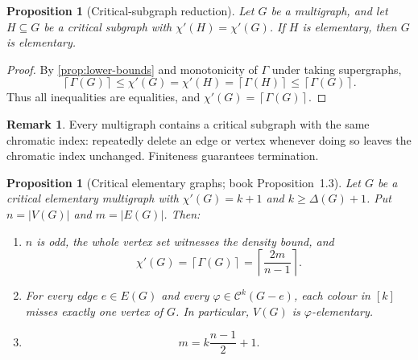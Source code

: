 \documentclass[11pt]{article}
\newtheorem{proposition}[theorem]{Proposition}
\theoremstyle{definition}
\newtheorem{remark}[theorem]{Remark}
\newcommand{\calC}{\mathcal C}
\newcommand{\abs}[1]{\lvert #1\rvert}
\newcommand{\ceil}[1]{\left\lceil #1\right\rceil}
\begin{document}
\begin{proposition}[Critical-subgraph reduction]\label{prop:critical-core}
Let $G$ be a multigraph, and let $H\subseteq G$ be a critical subgraph with
$\chi'(H)=\chi'(G)$.  If $H$ is elementary, then $G$ is elementary.
\end{proposition}

\begin{proof}
By \cref{prop:lower-bounds} and monotonicity of $\Gamma$ under taking
supergraphs,
\[
  \ceil{\Gamma(G)}
  \le \chi'(G)
  =\chi'(H)
  =\ceil{\Gamma(H)}
  \le\ceil{\Gamma(G)}.
\]
Thus all inequalities are equalities, and
$\chi'(G)=\ceil{\Gamma(G)}$.
\end{proof}

\begin{remark}
Every multigraph contains a critical subgraph with the same chromatic index:
repeatedly delete an edge or vertex whenever doing so leaves the chromatic index
unchanged.  Finiteness guarantees termination.
\end{remark}

\begin{proposition}[Critical elementary graphs; book Proposition~1.3]
\label{prop:critical-elementary}
Let $G$ be a critical elementary multigraph with
$\chi'(G)=k+1$ and $k\ge\Delta(G)+1$.  Put $n=\abs{V(G)}$ and
$m=\abs{E(G)}$.  Then:
\begin{enumerate}
  \item $n$ is odd, the whole vertex set witnesses the density bound, and
  \[
    \chi'(G)=\ceil{\Gamma(G)}
    =\ceil{\frac{2m}{n-1}}.
  \]
  \item For every edge $e\in E(G)$ and every
  $\varphi\in\calC^k(G-e)$, each colour in $[k]$ misses exactly one vertex
  of $G$.  In particular, $V(G)$ is $\varphi$-elementary.
  \item
  \[
    m=k\frac{n-1}{2}+1.
  \]
\end{enumerate}
\end{proposition}
\end{document}
